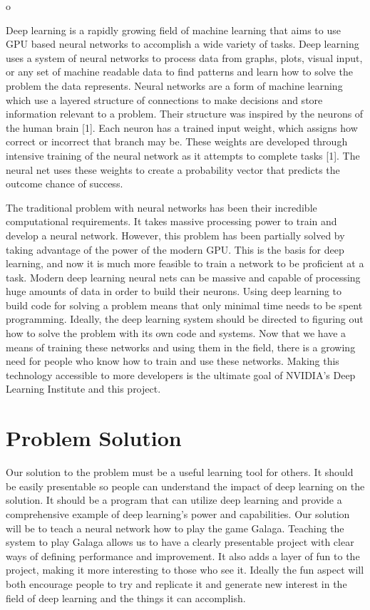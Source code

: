 o\documentclass[letterpaper,10pt]{article}
\begin{document}
Deep learning is a rapidly growing field of machine learning that aims to use GPU based neural networks to accomplish a wide variety of tasks.
Deep learning uses a system of neural networks to process data from graphs, plots, visual input, or any set of machine readable data to find patterns and learn how to solve the problem the data represents.
Neural networks are a form of machine learning which use a layered structure of connections to make decisions and store information relevant to a problem.
Their structure was inspired by the neurons of the human brain [1].
Each neuron has a trained input weight, which assigns how correct or incorrect that branch may be.
These weights are developed through intensive training of the neural network as it attempts to complete tasks [1].
The neural net uses these weights to create a probability vector that predicts the outcome chance of success.


The traditional problem with neural networks has been their incredible computational requirements.
 It takes massive processing power to train and develop a neural network.
 However, this problem has been partially solved by taking advantage of the power of the modern GPU.
 This is the basis for deep learning, and now it is much more feasible to train a network to be proficient at a task.
 Modern deep learning neural nets can be massive and capable of processing huge amounts of data in order to build their neurons.
 Using deep learning to build code for solving a problem means that only minimal time needs to be spent programming.
 Ideally, the deep learning system should be directed to figuring out how to solve the problem with its own code and systems.
 Now that we have a means of training these networks and using them in the field, there is a growing need for people who know how to train and use these networks.
 Making this technology accessible to more developers is the ultimate goal of NVIDIA's Deep Learning Institute and this project.


\section{Problem Solution}
Our solution to the problem must be a useful learning tool for others. 
It should be easily presentable so people can understand the impact of deep learning on the solution.
 It should be a program that can utilize deep learning and provide a comprehensive example of deep learning's power and capabilities.
 Our solution will be to teach a neural network how to play the game Galaga. 
 Teaching the system to play Galaga allows us to have a clearly presentable project with clear ways of defining performance and improvement.
 It also adds a layer of fun to the project, making it more interesting to those who see it.
 Ideally the fun aspect will both encourage people to try and replicate it and generate new interest in the field of deep learning and the things it can accomplish.
\end{document}
